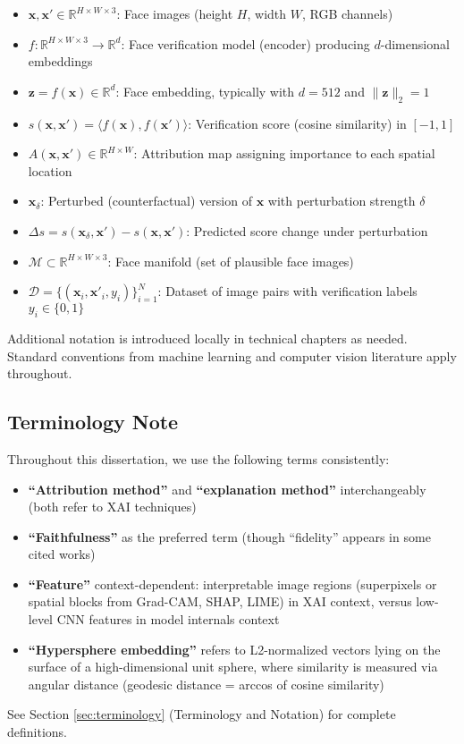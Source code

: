 \begin{itemize}
\item $\mathbf{x}, \mathbf{x}' \in \mathbb{R}^{H \times W \times 3}$: Face images (height $H$, width $W$, RGB channels)
\item $f: \mathbb{R}^{H \times W \times 3} \to \mathbb{R}^d$: Face verification model (encoder) producing $d$-dimensional embeddings
\item $\mathbf{z} = f(\mathbf{x}) \in \mathbb{R}^d$: Face embedding, typically with $d=512$ and $\|\mathbf{z}\|_2 = 1$
\item $s(\mathbf{x}, \mathbf{x}') = \langle f(\mathbf{x}), f(\mathbf{x}') \rangle$: Verification score (cosine similarity) in $[-1, 1]$
\item $A(\mathbf{x}, \mathbf{x}') \in \mathbb{R}^{H \times W}$: Attribution map assigning importance to each spatial location
\item $\mathbf{x}_\delta$: Perturbed (counterfactual) version of $\mathbf{x}$ with perturbation strength $\delta$
\item $\Delta s = s(\mathbf{x}_\delta, \mathbf{x}') - s(\mathbf{x}, \mathbf{x}')$: Predicted score change under perturbation
\item $\mathcal{M} \subset \mathbb{R}^{H \times W \times 3}$: Face manifold (set of plausible face images)
\item $\mathcal{D} = \{(\mathbf{x}_i, \mathbf{x}'_i, y_i)\}_{i=1}^N$: Dataset of image pairs with verification labels $y_i \in \{0,1\}$
\end{itemize}

Additional notation is introduced locally in technical chapters as needed. Standard conventions from machine learning and computer vision literature apply throughout.

\subsection{Terminology Note}

Throughout this dissertation, we use the following terms consistently:
\begin{itemize}
\item \textbf{``Attribution method''} and \textbf{``explanation method''} interchangeably (both refer to XAI techniques)
\item \textbf{``Faithfulness''} as the preferred term (though ``fidelity'' appears in some cited works)
\item \textbf{``Feature''} context-dependent: interpretable image regions (superpixels or spatial blocks from Grad-CAM, SHAP, LIME) in XAI context, versus low-level CNN features in model internals context
\item \textbf{``Hypersphere embedding''} refers to L2-normalized vectors lying on the surface of a high-dimensional unit sphere, where similarity is measured via angular distance (geodesic distance = arccos of cosine similarity)
\end{itemize}

See Section \ref{sec:terminology} (Terminology and Notation) for complete definitions.
